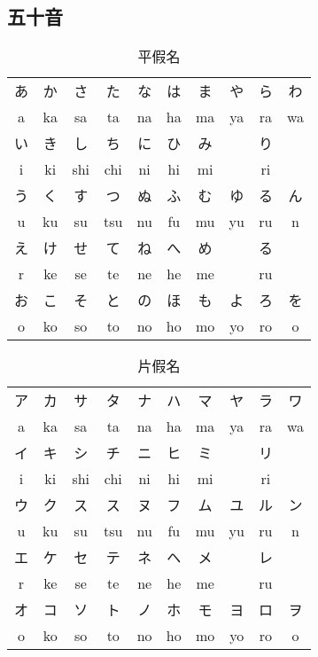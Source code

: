 \documentclass[12pt]{article}
\begin{document}
\begin{CJK}{UTF8}{cwku}
\renewcommand{\contentsname}{目錄}
\renewcommand{\tablename}{表}
\renewcommand{\figurename}{圖}
\renewcommand{\listtablename}{表格目錄}
\renewcommand{\listfigurename}{圖目錄}

\tableofcontents
\newpage


\section{五十音}

\begin{table}[htdp]
\caption{平假名}
\begin{tabular}{cccccccccc}
\hline
あ& か & さ & た & な & は & ま & や & ら & わ\\
a & ka & sa & ta & na & ha & ma& ya & ra & wa\\
\hline
い & き & し & ち & に & ひ & み & & り& \\
i & ki & shi & chi & ni & hi & mi & & ri& \\
\hline
う & く  & す & つ & ぬ & ふ & む & ゆ & る & ん\\	
 u & ku &  su &  tsu &  nu &  fu &  mu &  yu &  ru & n\\	
\hline
え & け & せ & て & ね & へ & め & & る & \\	
 r & ke &  se &  te &  ne &  he &  me & &  ru & \\	
\hline
お & こ  & そ & と & の & ほ & も & よ & ろ & を\\	
 o &  ko &  so &  to &  no &  ho &  mo &  yo &  ro & o\\	

\hline
\end{tabular}
\end{table}


\begin{table}[htdp]
\caption{片假名}
\begin{tabular}{cccccccccc}
\hline
ア& カ & サ & タ & ナ & ハ & マ & ヤ & ラ & ワ\\
a & ka & sa & ta & na & ha & ma& ya & ra & wa\\
\hline
イ& キ & シ & チ & ニ & ヒ & ミ &  & リ & \\
i & ki & shi & chi & ni & hi & mi & & ri& \\
\hline
ウ& ク & ス & ス & ヌ & フ & ム & ユ & ル & ン\\
 u & ku &  su &  tsu &  nu &  fu &  mu &  yu &  ru & n\\	
\hline
エ& ケ & セ & テ & ネ & ヘ & メ & & レ & \\
 r & ke &  se &  te &  ne &  he &  me & &  ru & \\	
\hline
オ& コ & ソ & ト & ノ & ホ & モ & ヨ & ロ & ヲ\\
 o &  ko &  so &  to &  no &  ho &  mo &  yo &  ro & o\\	


\end{tabular}
\end{table}
\end{CJK}
\end{document}
